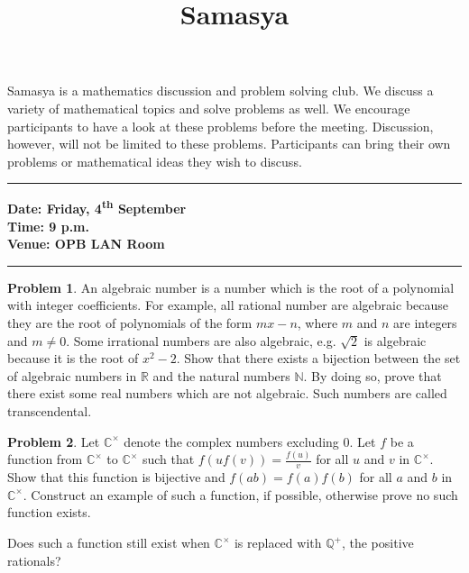 \documentclass[10pt,a4paper,notitlepage]{article}
\title{\textrm{\textbf{\fontsize{30}{40}\selectfont Samasya}}}
\date{%
    }
\theoremstyle{definition}
\newtheorem{prob}{Problem}
\begin{document}
\maketitle

Samasya is a mathematics discussion and problem solving club.
We discuss a variety of mathematical topics and solve problems as well.
We encourage participants to have a look at these problems %
 before the meeting.
Discussion, however, will not be limited to these problems.
Participants can bring their own problems or mathematical ideas they wish to discuss.\\
\hrule

\textbf{Date: Friday, 4\textsuperscript{th} September}%
\\
\textbf{Time: 9 p.m.}%
\\
\textbf{Venue: OPB LAN Room}%
\\
\hrule


\begin{prob}
An algebraic number is a number which is the root of a polynomial with integer coefficients. For example, all rational number are algebraic because they are the root of polynomials of the form $mx-n$, where $m$ and $n$ are integers and $m \neq 0$. Some irrational numbers are also algebraic, e.g. $\sqrt{2}$ is algebraic because it is the root of $x^2-2$. Show that there exists a bijection between the set of algebraic numbers in $\mathbb{R}$ and the natural numbers $\mathbb{N}$. By doing so, prove that there exist some real numbers which are not algebraic. Such numbers are called transcendental.
\end{prob}

\begin{prob}
Let $\mathbb{C}^{\times}$ denote the complex numbers excluding $0$. Let $f$ be a function from $\mathbb{C}^{\times}$ to $\mathbb{C}^{\times}$ such that $f(uf(v))= \frac{f(u)}{v}$ for all $u$ and $v$ in $\mathbb{C}^{\times}$. Show that this function is bijective and $f(ab)=f(a)f(b)$ for all $a$ and $b$ in $\mathbb{C}^{\times}$. Construct an example of such a function, if possible, otherwise prove no such function exists.

Does such a function still exist when $\mathbb{C}^{\times}$ is replaced with $\mathbb{Q}^{+}$, the positive rationals?
\end{prob}
\end{document}
